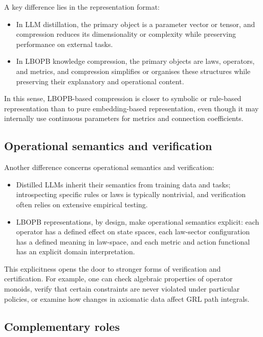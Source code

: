\documentclass[11pt]{book}
\theoremstyle{plain}
\theoremstyle{definition}
\theoremstyle{remark}
\begin{document}
A key difference lies in the representation format:

\begin{itemize}
  \item In LLM distillation, the primary object is a parameter vector
        or tensor, and compression reduces its dimensionality or
        complexity while preserving performance on external tasks.
  \item In LBOPB knowledge compression, the primary objects are laws,
        operators, and metrics, and compression simplifies or organises
        these structures while preserving their explanatory and
        operational content.
\end{itemize}

In this sense, LBOPB-based compression is closer to symbolic or
rule-based representation than to pure embedding-based representation,
even though it may internally use continuous parameters for metrics
and connection coefficients.

\subsection*{Operational semantics and verification}

Another difference concerns operational semantics and verification:

\begin{itemize}
  \item Distilled LLMs inherit their semantics from training data and
        tasks; introspecting specific rules or laws is typically
        nontrivial, and verification often relies on extensive
        empirical testing.
  \item LBOPB representations, by design, make operational semantics
        explicit: each operator has a defined effect on state spaces,
        each law-sector configuration has a defined meaning in
        law-space, and each metric and action functional has an
        explicit domain interpretation.
\end{itemize}

This explicitness opens the door to stronger forms of verification and
certification. For example, one can check algebraic properties of
operator monoids, verify that certain constraints are never violated
under particular policies, or examine how changes in axiomatic data
affect GRL path integrals.

\subsection*{Complementary roles}
\end{document}
